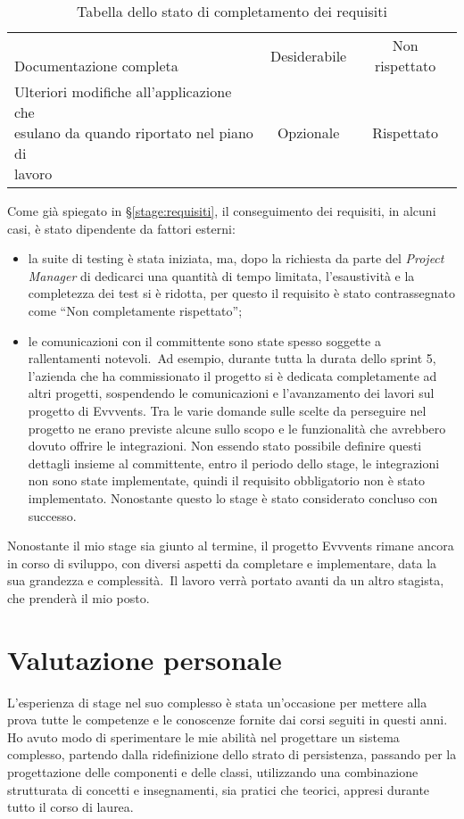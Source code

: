 \begin{table}[h]
\begin{tabularx}{\textwidth}{X|c|c}
		\makecell[l]{\vspace{-6pt} \\ Documentazione completa \\ \vspace{-6pt}} & Desiderabile & Non rispettato \\
		\makecell[l]{Ulteriori modifiche all'applicazione che \\ esulano da quando riportato nel piano di \\ lavoro} & Opzionale & Rispettato
	\end{tabularx}
	\vspace{5pt}
	\caption{Tabella dello stato di completamento dei requisiti}
	\label{tab:raggiungimento-obiettivi}
\end{table}

\noindent Come già spiegato in \S \ref{stage:requisiti}, il conseguimento dei requisiti, in alcuni casi, è stato dipendente da fattori esterni:
\begin{itemize}
	\item la suite di testing è stata iniziata, ma, dopo la richiesta da parte del \emph{Project Manager} di dedicarci una quantità di tempo limitata, l'esaustività e la completezza dei test si è ridotta, per questo il requisito è stato contrassegnato come ``Non completamente rispettato'';
	\item le comunicazioni con il committente sono state spesso soggette a rallentamenti notevoli.\ Ad esempio, durante tutta la durata dello sprint 5, l'azienda che ha commissionato il progetto si è dedicata completamente ad altri progetti, sospendendo le comunicazioni e l'avanzamento dei lavori sul progetto di Evvvents. Tra le varie domande sulle scelte da perseguire nel progetto ne erano previste alcune sullo scopo e le funzionalità che avrebbero dovuto offrire le integrazioni. Non essendo stato possibile definire questi dettagli insieme al committente, entro il periodo dello stage, le integrazioni non sono state implementate, quindi il requisito obbligatorio non è stato implementato. Nonostante questo lo stage è stato considerato concluso con successo.
\end{itemize}
Nonostante il mio stage sia giunto al termine, il progetto Evvvents rimane ancora in corso di sviluppo, con diversi aspetti da completare e implementare, data la sua grandezza e complessità.\ Il lavoro verrà portato avanti da un altro stagista, che prenderà il mio posto.

\section{Valutazione personale}
L'esperienza di stage nel suo complesso è stata un'occasione per mettere alla prova tutte le competenze e le conoscenze fornite dai corsi seguiti in questi anni. Ho avuto modo di sperimentare le mie abilità nel progettare un sistema complesso, partendo dalla ridefinizione dello strato di persistenza, passando per la progettazione delle componenti e delle classi, utilizzando una combinazione strutturata di concetti e insegnamenti, sia pratici che teorici, appresi durante tutto il corso di laurea.

